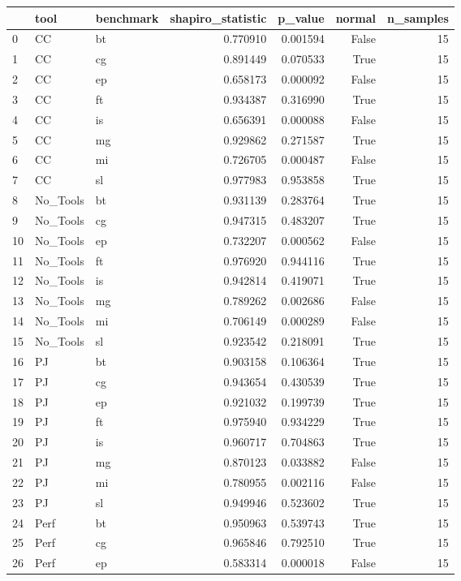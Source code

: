 \begin{tabular}{lllrrrr}
\toprule
 & tool & benchmark & shapiro_statistic & p_value & normal & n_samples \\
\midrule
0 & CC & bt & 0.770910 & 0.001594 & False & 15 \\
1 & CC & cg & 0.891449 & 0.070533 & True & 15 \\
2 & CC & ep & 0.658173 & 0.000092 & False & 15 \\
3 & CC & ft & 0.934387 & 0.316990 & True & 15 \\
4 & CC & is & 0.656391 & 0.000088 & False & 15 \\
5 & CC & mg & 0.929862 & 0.271587 & True & 15 \\
6 & CC & mi & 0.726705 & 0.000487 & False & 15 \\
7 & CC & sl & 0.977983 & 0.953858 & True & 15 \\
8 & No_Tools & bt & 0.931139 & 0.283764 & True & 15 \\
9 & No_Tools & cg & 0.947315 & 0.483207 & True & 15 \\
10 & No_Tools & ep & 0.732207 & 0.000562 & False & 15 \\
11 & No_Tools & ft & 0.976920 & 0.944116 & True & 15 \\
12 & No_Tools & is & 0.942814 & 0.419071 & True & 15 \\
13 & No_Tools & mg & 0.789262 & 0.002686 & False & 15 \\
14 & No_Tools & mi & 0.706149 & 0.000289 & False & 15 \\
15 & No_Tools & sl & 0.923542 & 0.218091 & True & 15 \\
16 & PJ & bt & 0.903158 & 0.106364 & True & 15 \\
17 & PJ & cg & 0.943654 & 0.430539 & True & 15 \\
18 & PJ & ep & 0.921032 & 0.199739 & True & 15 \\
19 & PJ & ft & 0.975940 & 0.934229 & True & 15 \\
20 & PJ & is & 0.960717 & 0.704863 & True & 15 \\
21 & PJ & mg & 0.870123 & 0.033882 & False & 15 \\
22 & PJ & mi & 0.780955 & 0.002116 & False & 15 \\
23 & PJ & sl & 0.949946 & 0.523602 & True & 15 \\
24 & Perf & bt & 0.950963 & 0.539743 & True & 15 \\
25 & Perf & cg & 0.965846 & 0.792510 & True & 15 \\
26 & Perf & ep & 0.583314 & 0.000018 & False & 15 \\

\end{tabular}
